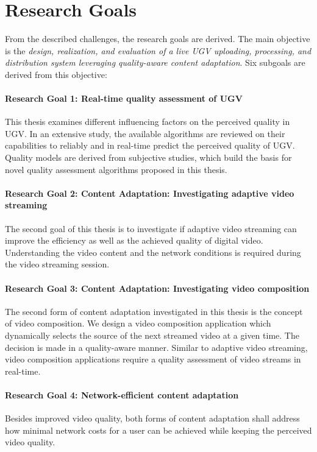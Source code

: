 \section{Research Goals}
From the described challenges, the research goals are derived.
The main objective is the \emph{design, realization, and evaluation of a live \ac{UGV} uploading, processing, and distribution system leveraging quality-aware content adaptation}.
Six subgoals are derived from this objective:
\paragraph{Research Goal 1: Real-time quality assessment of \ac{UGV}}
This thesis examines different influencing factors on the perceived quality in \ac{UGV}.
In an extensive study, the available algorithms are reviewed on their capabilities to reliably and in real-time predict the perceived quality of \ac{UGV}. 
Quality models are derived from subjective studies, which build the basis for novel quality assessment algorithms proposed in this thesis. 
\paragraph{Research Goal 2: Content Adaptation: Investigating adaptive video streaming} 
The second goal of this thesis is to investigate if adaptive video streaming can improve the efficiency as well as the achieved quality of digital video.
Understanding the video content and the network conditions is required during the video streaming session.
\paragraph{Research Goal 3: Content Adaptation: Investigating video composition} 
The second form of content adaptation investigated in this thesis is the concept of video composition.
We design a video composition application which dynamically selects the source of the next streamed video at a given time.
The decision is made in a quality-aware manner. 
Similar to adaptive video streaming, video composition applications require a quality assessment of video streams in real-time.
\paragraph{Research Goal 4: Network-efficient content adaptation} 
Besides improved video quality, both forms of content adaptation shall address how minimal network costs for a user can be achieved while keeping the perceived video quality.
